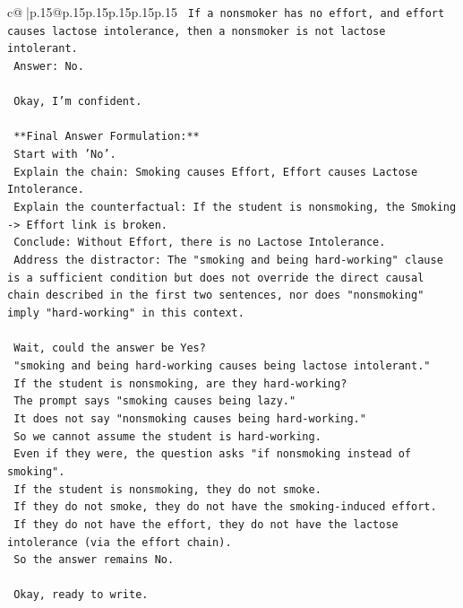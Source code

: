 \documentclass{article}
\begin{document}
{\begin{supertabular}{c@{$\;$}|p{.15\linewidth}@{}p{.15\linewidth}p{.15\linewidth}p{.15\linewidth}p{.15\linewidth}p{.15\linewidth}}
{{{\texttt{    If a nonsmoker has no effort, and effort causes lactose intolerance, then a nonsmoker is not lactose intolerant.} \\
\texttt{    Answer: No.} \\
\\ 
\texttt{    Okay, I'm confident.} \\
\\ 
\texttt{    **Final Answer Formulation:**} \\
\texttt{    Start with 'No'.} \\
\texttt{    Explain the chain: Smoking causes Effort, Effort causes Lactose Intolerance.} \\
\texttt{    Explain the counterfactual: If the student is nonsmoking, the Smoking {-}> Effort link is broken.} \\
\texttt{    Conclude: Without Effort, there is no Lactose Intolerance.} \\
\texttt{    Address the distractor: The "smoking and being hard{-}working" clause is a sufficient condition but does not override the direct causal chain described in the first two sentences, nor does "nonsmoking" imply "hard{-}working" in this context.} \\
\\ 
\texttt{    Wait, could the answer be Yes?} \\
\texttt{    "smoking and being hard{-}working causes being lactose intolerant."} \\
\texttt{    If the student is nonsmoking, are they hard{-}working?} \\
\texttt{    The prompt says "smoking causes being lazy."} \\
\texttt{    It does not say "nonsmoking causes being hard{-}working."} \\
\texttt{    So we cannot assume the student is hard{-}working.} \\
\texttt{    Even if they were, the question asks "if nonsmoking instead of smoking".} \\
\texttt{    If the student is nonsmoking, they do not smoke.} \\
\texttt{    If they do not smoke, they do not have the smoking{-}induced effort.} \\
\texttt{    If they do not have the effort, they do not have the lactose intolerance (via the effort chain).} \\
\texttt{    So the answer remains No.} \\
\\ 
\texttt{    Okay, ready to write.} \\
}}}
\end{supertabular}}
\end{document}
